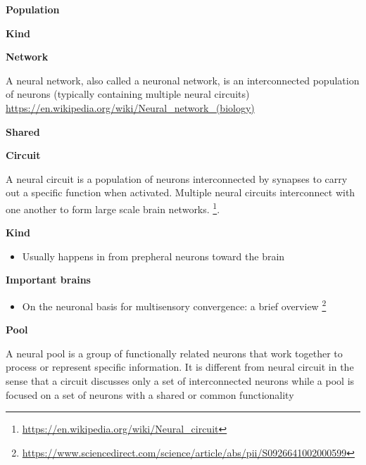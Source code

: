 \documentclass{book}
\providecommand{\ProjectDeepHeading}[2]{%
    \par\medskip\noindent\textbf{#2}\par\smallskip
}
\providecommand{\seeherefooter}[1]{\footnote{\url{#1}}}
\begin{document}
\ProjectDeepHeading{3}{Population}

\ProjectDeepHeading{4}{Kind}

\ProjectDeepHeading{5}{Network}


A neural network, also called a neuronal network, is an interconnected population of neurons (typically containing multiple neural circuits) \url{https://en.wikipedia.org/wiki/Neural_network_(biology)}

\ProjectDeepHeading{6}{Shared}

\ProjectDeepHeading{7}{Circuit}


A neural circuit is a population of neurons interconnected by synapses to carry out a specific function when activated. Multiple neural circuits interconnect with one another to form large scale brain networks. \seeherefooter{https://en.wikipedia.org/wiki/Neural_circuit}.

\ProjectDeepHeading{8}{Kind}


\begin{itemize}
        \item Usually happens in from prepheral neurons toward the brain
    \end{itemize}
    
    \ProjectDeepHeading{11}{Important brains}
    \begin{itemize}
        \item On the neuronal basis for multisensory convergence: a brief overview \seeherefooter{https://www.sciencedirect.com/science/article/abs/pii/S0926641002000599}
    \end{itemize}

\ProjectDeepHeading{5}{Pool}


A neural pool is a group of functionally related neurons that work together to process or represent specific information. It is different from neural circuit in the sense that a circuit discusses only a set of interconnected neurons while a pool is focused on a set of neurons with a shared or common functionality
    
\end{document}
